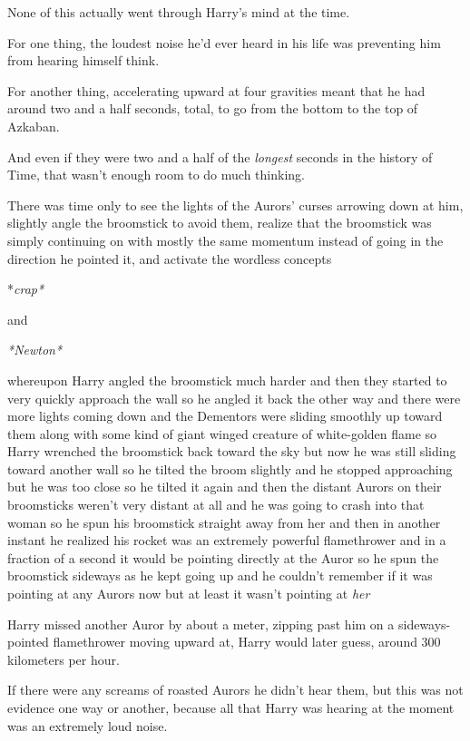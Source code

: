 None of this actually went through Harry's mind at the time.

For one thing, the loudest noise he'd ever heard in his life was preventing him 
from hearing himself think.

For another thing, accelerating upward at four gravities meant that he had 
around two and a half seconds, total, to go from the bottom to the top of 
Azkaban.

And even if they were two and a half of the \emph{longest} seconds in the 
history of Time, that wasn't enough room to do much thinking.

There was time only to see the lights of the Aurors' curses arrowing down at 
him, slightly angle the broomstick to avoid them, realize that the broomstick 
was simply continuing on with mostly the same momentum instead of going in the 
direction he pointed it, and activate the wordless concepts

*\emph{crap*}

and

\emph{*Newton*}

whereupon Harry angled the broomstick much harder and then they started to very 
quickly approach the wall so he angled it back the other way and there were 
more lights coming down and the Dementors were sliding smoothly up toward them 
along with some kind of giant winged creature of white-golden flame so Harry 
wrenched the broomstick back toward the sky but now he was still sliding toward 
another wall so he tilted the broom slightly and he stopped approaching but he 
was too close so he tilted it again and then the distant Aurors on their 
broomsticks weren't very distant at all and he was going to crash into that 
woman so he spun his broomstick straight away from her and then in another 
instant he realized his rocket was an extremely powerful flamethrower and in a 
fraction of a second it would be pointing directly at the Auror so he spun the 
broomstick sideways as he kept going up and he couldn't remember if it was 
pointing at any Aurors now but at least it wasn't pointing at \emph{her}

Harry missed another Auror by about a meter, zipping past him on a 
sideways-pointed flamethrower moving upward at, Harry would later guess, around 
300 kilometers per hour.

If there were any screams of roasted Aurors he didn't hear them, but this was 
not evidence one way or another, because all that Harry was hearing at the 
moment was an extremely loud noise.


